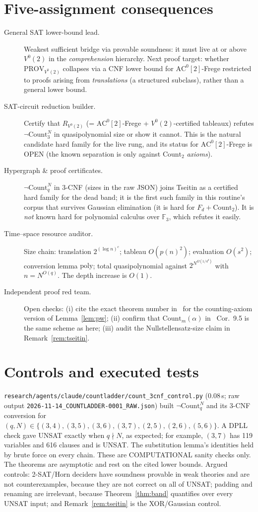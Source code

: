 \documentclass[11pt]{article}
\theoremstyle{definition}
\newcommand{\Count}{\mathrm{Count}}
\begin{document}
\section{Five-assignment consequences}
\begin{description}
\item[General SAT lower-bound lead.] Weakest sufficient bridge via provable soundness: it must live at or above $V^0(2)$ in the
\emph{comprehension} hierarchy. Next proof target: whether $\mathrm{PROV}_{V^0(2)}$ collapses via a CNF lower bound for
$\mathrm{AC}^0[2]$-Frege restricted to proofs arising from \emph{translations} (a structured subclass), rather than a general lower bound.
\item[SAT-circuit reduction builder.] Certify that $R_{V^0(2)}$ (= $\mathrm{AC}^0[2]$-Frege + $V^0(2)$-certified tableaux) refutes
$\neg\Count^N_3$ in quasipolynomial size or show it cannot. This is the natural candidate hard family for the live rung, and its status
for $\mathrm{AC}^0[2]$-Frege is OPEN (the known separation is only against $\Count_2$ \emph{axioms}).
\item[Hypergraph \& proof certificates.] $\neg\Count^N_q$ in 3-CNF (sizes in the raw JSON) joins Tseitin as a certified hard family
for the dead band; it is the first such family in this routine's corpus that survives Gaussian elimination
(it is hard for $F_d+\Count_2$). It is \emph{not} known hard for polynomial calculus over $\mathbb F_3$, which refutes it easily.
\item[Time--space resource auditor.] Size chain: translation $2^{(\log n)^c}$; tableau $O(p(n)^2)$; evaluation $O(s^2)$; conversion
lemma $\mathrm{poly}$; total quasipolynomial against $2^{N^{\Omega(1/4^d)}}$ with $n=N^{O(q)}$. The depth increase is $O(1)$.
\item[Independent proof red team.] Open checks: (i) cite the exact theorem number in~\cite{Kra95} for the counting-axiom version of
Lemma~\ref{lem:pw}; (ii) confirm that $\Count_m(\alpha)$ in~\cite{BR98} Cor.~9.5 is the same scheme as here; (iii) audit the
Nullstellensatz-size claim in Remark~\ref{rem:tseitin}.
\end{description}

\section{Controls and executed tests}
\texttt{research/agents/claude/countladder/count\_3cnf\_control.py} (0.08\,s; raw output
\texttt{2026-11-14\_COUNTLADDER-0001\_RAW.json}) built $\neg\Count^N_q$ and its 3-CNF conversion for
$(q,N)\in\{(3,4),(3,5),(3,6),(3,7),(2,5),(2,6),(5,6)\}$. A DPLL check gave UNSAT exactly when $q\nmid N$, as expected; for example,
$(3,7)$ has 119 variables and 616 clauses and is UNSAT. The substitution lemma's identities held by brute force on every chain.
These are COMPUTATIONAL sanity checks only. The theorems are asymptotic and rest on the cited lower bounds.
Argued controls: 2-SAT/Horn deciders have soundness provable in weak theories and are not counterexamples, because they are not correct on all of UNSAT;
padding and renaming are irrelevant, because Theorem~\ref{thm:band} quantifies over every UNSAT input; and Remark~\ref{rem:tseitin} is the
XOR/Gaussian control.
\end{document}
